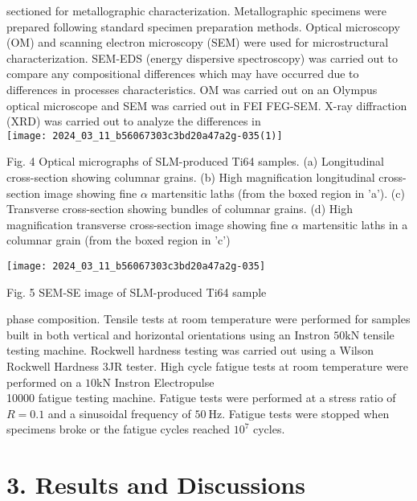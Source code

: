 \documentclass[10pt]{article}
\begin{document}
sectioned for metallographic characterization. Metallographic specimens were prepared following standard specimen preparation methods. Optical microscopy (OM) and scanning electron microscopy (SEM) were used for microstructural characterization. SEM-EDS (energy dispersive spectroscopy) was carried out to compare any compositional differences which may have occurred due to differences in processes characteristics. OM was carried out on an Olympus optical microscope and SEM was carried out in FEI FEG-SEM. X-ray diffraction (XRD) was carried out to analyze the differences in\\
\texttt{[image: 2024\_03\_11\_b56067303c3bd20a47a2g-035(1)]}

Fig. 4 Optical micrographs of SLM-produced Ti64 samples. (a) Longitudinal cross-section showing columnar grains. (b) High magnification longitudinal cross-section image showing fine $\alpha$ martensitic laths (from the boxed region in 'a'). (c) Transverse cross-section showing bundles of columnar grains. (d) High magnification transverse cross-section image showing fine $\alpha$ martensitic laths in a columnar grain (from the boxed region in 'c')

\begin{center}
\texttt{[image: 2024\_03\_11\_b56067303c3bd20a47a2g-035]}
\end{center}

Fig. 5 SEM-SE image of SLM-produced Ti64 sample

phase composition. Tensile tests at room temperature were performed for samples built in both vertical and horizontal orientations using an Instron $50 \mathrm{kN}$ tensile testing machine. Rockwell hardness testing was carried out using a Wilson Rockwell Hardness 3JR tester. High cycle fatigue tests at room temperature were performed on a $10 \mathrm{kN}$ Instron Electropulse\\
10000 fatigue testing machine. Fatigue tests were performed at a stress ratio of $R=0.1$ and a sinusoidal frequency of $50 \mathrm{~Hz}$. Fatigue tests were stopped when specimens broke or the fatigue cycles reached $10^{7}$ cycles.

\section*{3. Results and Discussions}
\end{document}

